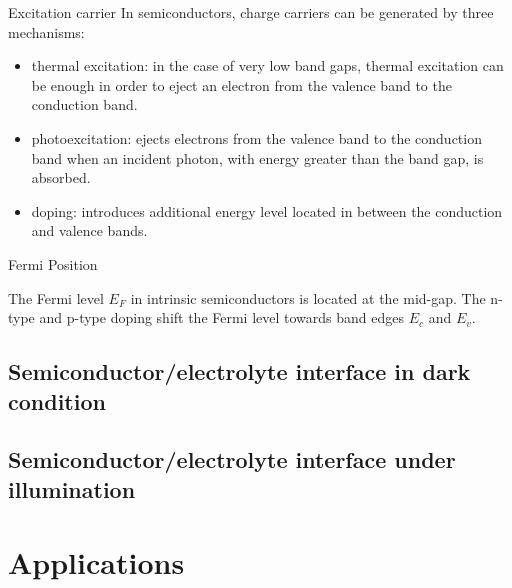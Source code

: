 \documentclass[10pt,compress]{beamer}
\begin{document}
    \begin{frame}[allowframebreaks=1.0]{Excitation carrier}
        In semiconductors, charge carriers can be generated by three mechanisms: 
        \begin{itemize}
            \item thermal excitation: in the case of very low band gaps, thermal excitation can be enough in order 
            to eject an electron from the valence band to the conduction band.
            \item photoexcitation: ejects electrons from the valence band to the conduction 
            band when an incident photon, with energy greater than the band gap, is absorbed.
            \item doping: introduces additional energy level located in between the conduction and 
            valence bands.
        \end{itemize}
        
        
    \end{frame}

    \begin{frame}{Fermi Position}
        
        The Fermi level $E_F$ in intrinsic semiconductors is located at the mid-gap. 
        The n-type and p-type doping shift the Fermi level towards band edges 
        $E_c$ and $E_v$.
    \end{frame}


\subsection{Semiconductor/electrolyte interface in dark condition}


\subsection{Semiconductor/electrolyte interface under illumination}


\section{Applications}
\end{document}
